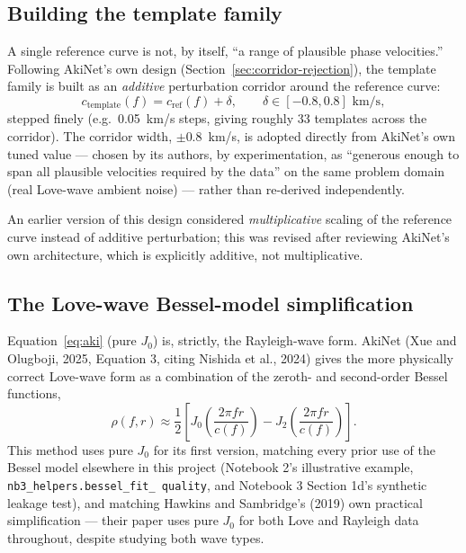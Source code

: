 \documentclass[11pt]{article}
\begin{document}
\subsection{Building the template family}
\label{sec:template-family}

A single reference curve is not, by itself, ``a range of plausible phase velocities.'' Following
AkiNet's own design (Section~\ref{sec:corridor-rejection}), the template family is built as an
\emph{additive} perturbation corridor around the reference curve:
\begin{equation}
  c_{\text{template}}(f) = c_{\text{ref}}(f) + \delta, \qquad \delta \in [-0.8, 0.8] \text{ km/s},
\end{equation}
stepped finely (e.g.\ 0.05~km/s steps, giving roughly 33 templates across the corridor). The
corridor width, $\pm 0.8$~km/s, is adopted directly from AkiNet's own tuned value --- chosen by
its authors, by experimentation, as ``generous enough to span all plausible velocities required by
the data'' on the same problem domain (real Love-wave ambient noise) --- rather than re-derived
independently.

An earlier version of this design considered \emph{multiplicative} scaling of the reference curve
instead of additive perturbation; this was revised after reviewing AkiNet's own architecture,
which is explicitly additive, not multiplicative.

\subsection{The Love-wave Bessel-model simplification}
\label{sec:love-caveat}

Equation~\ref{eq:aki} (pure $J_0$) is, strictly, the Rayleigh-wave form. AkiNet (Xue and Olugboji,
2025, Equation 3, citing Nishida et al., 2024) gives the more physically correct Love-wave form as
a combination of the zeroth- and second-order Bessel functions,
\begin{equation}
  \rho(f, r) \approx \frac{1}{2}\left[J_0\!\left(\frac{2\pi f r}{c(f)}\right) - J_2\!\left(\frac{2\pi f r}{c(f)}\right)\right].
\end{equation}
This method uses pure $J_0$ for its first version, matching every prior use of the Bessel model
elsewhere in this project (Notebook 2's illustrative example, \texttt{nb3\_helpers.bessel\_fit\_
quality}, and Notebook 3 Section 1d's synthetic leakage test), and matching Hawkins and
Sambridge's (2019) own practical simplification --- their paper uses pure $J_0$ for both Love and
Rayleigh data throughout, despite studying both wave types.
\end{document}
